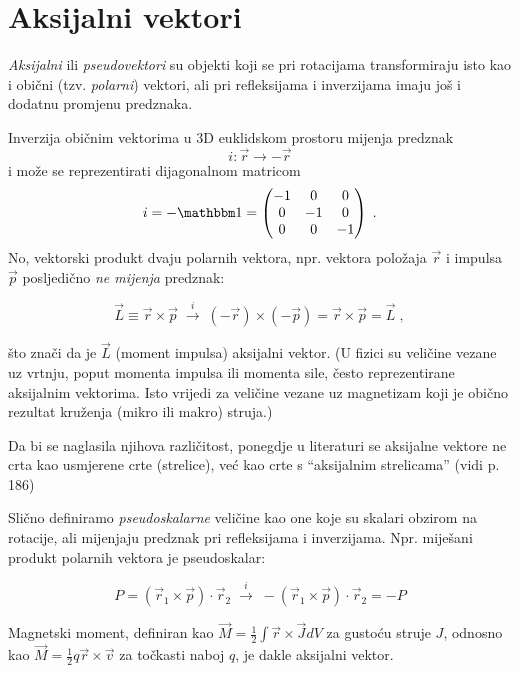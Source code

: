 \chapter{Aksijalni vektori}
\label{sec:aksijalni}

\emph{Aksijalni} ili \emph{pseudovektori} su objekti koji se pri rotacijama transformiraju
isto kao i obični (tzv. \emph{polarni}) vektori, ali pri refleksijama i inverzijama
imaju još i dodatnu promjenu predznaka.

Inverzija običnim vektorima u 3D euklidskom prostoru mijenja
predznak 
$$i: \vec{r} \to - \vec{r}$$ 
i može se reprezentirati dijagonalnom
matricom 
$$
i = -\Eins = 
\begin{pmatrix}
    -1 & 0 & 0 \\
    0 & -1 & 0 \\
    0 & 0 & -1
\end{pmatrix} \;.
$$
No, vektorski produkt dvaju polarnih vektora, npr. vektora položaja $\vec{r}$
i impulsa $\vec{p}$ posljedično \emph{ne mijenja} predznak:

\[  \vec{L}\equiv \vec{r}\times\vec{p} \; \stackrel{i}{\longrightarrow} \;
  (-\vec{r}) \times (-\vec{p}) =  \vec{r}\times\vec{p} = \vec{L}  \;,
\]

što znači da je $\vec{L}$ (moment impulsa) aksijalni vektor. (U fizici su
veličine vezane uz vrtnju, poput momenta impulsa ili momenta sile, 
često reprezentirane aksijalnim vektorima. Isto vrijedi za veličine
vezane uz magnetizam koji je obično rezultat kruženja (mikro ili makro) struja.)

Da bi se naglasila njihova različitost,
ponegdje u literaturi se aksijalne vektore ne crta kao usmjerene crte
(strelice), već kao crte s ``aksijalnim strelicama'' (vidi 
\cite{Bronstejn:2004} p. 186)

\centerline{}

Slično definiramo \emph{pseudoskalarne} veličine kao one koje su skalari
obzirom na rotacije, ali mijenjaju predznak pri refleksijama i inverzijama.
Npr. miješani produkt polarnih vektora je pseudoskalar:

\[
P = (\vec{r}_1 \times \vec{p}) \cdot \vec{r}_2  \; \stackrel{i}{\longrightarrow} \;
  - (\vec{r}_1 \times \vec{p}) \cdot \vec{r}_2 = - P
\]

Magnetski moment, definiran kao $\vec{M} = \frac{1}{2} \int \vec{r}
\times \vec{J} dV$ za gustoću struje $J$, odnosno kao
$\vec{M} = \frac{1}{2} q \vec{r} \times \vec{v}$ za točkasti
naboj $q$, je dakle aksijalni vektor.

